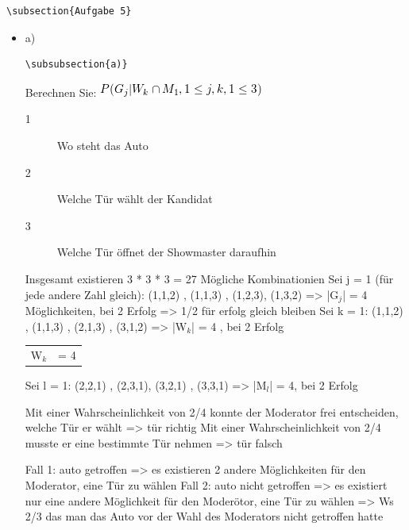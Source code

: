 \documentclass[11pt]{article}
\begin{document}
\begin{verbatim}
\subsection{Aufgabe 5}
\end{verbatim}
\begin{itemize}

\item a)\\
\label{sec-3-8-6-1}%
\begin{verbatim}
\subsubsection{a)}
\end{verbatim}

Berechnen Sie: \includegraphics[width=.9\linewidth]{201301ad-12403211367WJq.png}

\begin{description}
\item[1] Wo steht das Auto
\item[2] Welche Tür wählt der Kandidat
\item[3] Welche Tür öffnet der Showmaster daraufhin
\end{description}

Insgesamt existieren 3 * 3 * 3 = 27 Mögliche Kombinationien
Sei j = 1 (für jede andere Zahl gleich):
    (1,1,2) , (1,1,3) , (1,2,3), (1,3,2) => |G$_j$| = 4 Möglichkeiten, bei 2 Erfolg => 1/2 für erfolg gleich bleiben
Sei k = 1: 
    (1,1,2) , (1,1,3) , (2,1,3) , (3,1,2) => |W$_k$| = 4 , bei 2 Erfolg

\begin{center}
\begin{tabular}{ll}
 W$_k$  &  = 4  \\
\end{tabular}
\end{center}


Sei l = 1: 
    (2,2,1) , (2,3,1), (3,2,1) , (3,3,1) => |M$_l$| = 4, bei 2 Erfolg

Mit einer Wahrscheinlichkeit von 2/4 konnte der Moderator frei entscheiden, welche Tür er wählt => tür richtig
Mit einer Wahrscheinlichkeit von 2/4 musste er eine bestimmte Tür nehmen => tür falsch

Fall 1: auto getroffen => es existieren 2 andere Möglichkeiten für den Moderator, eine Tür zu wählen
Fall 2: auto nicht getroffen => es existiert nur eine andere Möglichkeit für den Moderötor, eine Tür zu wählen
=> Ws 2/3 das man das Auto vor der Wahl des Moderators nicht getroffen hatte



\end{itemize}
\end{document}
